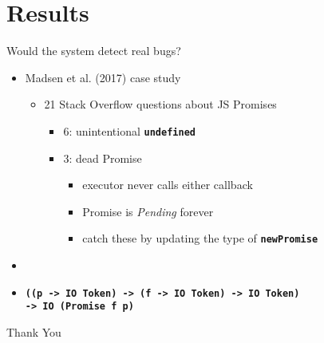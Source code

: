 \documentclass{beamer}
\newcommand{\lit}[1]{\textbf{\texttt{#1}}}
\begin{document}
\section{Results}

\begin{frame}
  \centering{\Large \insertsection}
\end{frame}


\begin{frame}
  \begin{block}{}
    Would the system detect real bugs?
  \end{block}
  \begin{itemize}
    \pause\item Madsen et al. (2017) case study
    \begin{itemize}
      \pause\item 21 Stack Overflow questions about JS Promises
      \begin{itemize}
      \pause\item 6: unintentional \lit{undefined} \pause {\huge
          \checkmark} \pause\item 3: dead Promise 
      \begin{itemize}
        \pause\item executor never calls either callback
        \pause\item Promise is \emph{Pending} forever
        \pause\item catch these by updating the type of \lit{newPromise}
      \end{itemize}
    \end{itemize}
    \end{itemize}
    \pause\item\item\lit{((p -> IO Token) -> (f -> IO Token) -> IO Token)\\
        \qquad  -> IO (Promise f p)}
  \end{itemize}
\end{frame}

\begin{frame}
  \center \huge Thank You
\end{frame}
\end{document}

